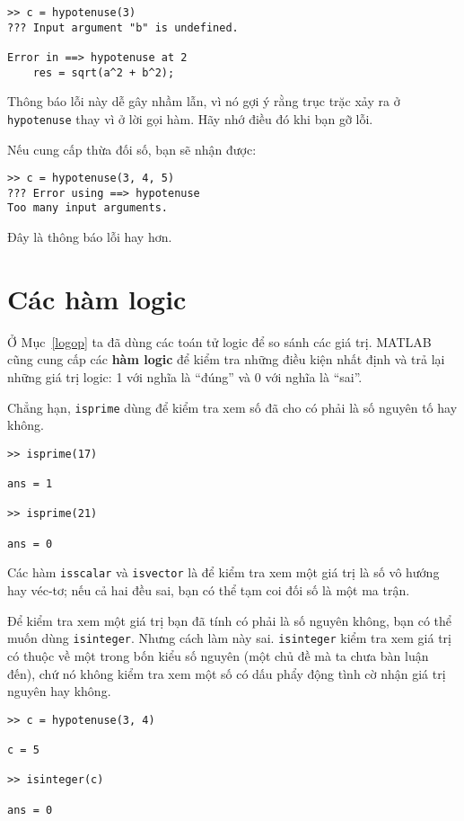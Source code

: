 \documentclass[12pt]{book}
\begin{document}
\begin{verbatim}
>> c = hypotenuse(3)
??? Input argument "b" is undefined.

Error in ==> hypotenuse at 2
    res = sqrt(a^2 + b^2);
\end{verbatim}

Thông báo lỗi này dễ gây nhầm lẫn, vì nó gợi ý rằng trục trặc
xảy ra ở {\tt hypotenuse} thay vì ở lời gọi hàm. Hãy nhớ điều đó
khi bạn gỡ lỗi.

Nếu cung cấp thừa đối số, bạn sẽ nhận được:

\begin{verbatim}
>> c = hypotenuse(3, 4, 5)
??? Error using ==> hypotenuse
Too many input arguments.
\end{verbatim}

Đây là thông báo lỗi hay hơn.


\section{Các hàm logic}

Ở Mục~\ref{logop} ta đã dùng các toán tử logic để so sánh các 
giá trị. MATLAB cũng cung cấp các {\bf hàm logic} để kiểm tra những
điều kiện nhất định và trả lại những giá trị logic: 1 với nghĩa là 
``đúng'' và 0 với nghĩa là ``sai''.

Chẳng hạn, {\tt isprime} dùng để kiểm tra xem số đã cho có
phải là số nguyên tố hay không.

\begin{verbatim}
>> isprime(17)

ans = 1

>> isprime(21)

ans = 0
\end{verbatim}

Các hàm {\tt isscalar} và {\tt isvector} là để kiểm tra xem một
giá trị là số vô hướng hay véc-tơ; nếu cả hai đều sai, bạn có thể
tạm coi đối số là một ma trận.

Để kiểm tra xem một giá trị bạn đã tính có phải là số nguyên không,
bạn có thể muốn dùng {\tt isinteger}.  Nhưng cách làm này sai.
{\tt isinteger} kiểm tra xem giá trị có thuộc về một trong bốn kiểu
số nguyên (một chủ đề mà ta chưa bàn luận đến), chứ nó không kiểm
tra xem một số có dấu phẩy động tình cờ nhận giá trị nguyên hay không.

\begin{verbatim}
>> c = hypotenuse(3, 4)

c = 5

>> isinteger(c)

ans = 0
\end{verbatim}
\end{document}
